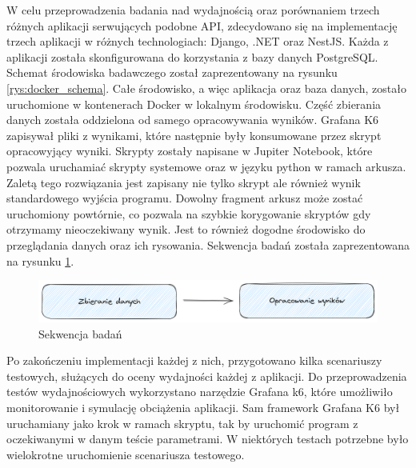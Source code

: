 W celu przeprowadzenia badania nad wydajnością oraz porównaniem trzech różnych aplikacji serwujących podobne API, zdecydowano się na implementację trzech aplikacji w różnych technologiach: Django, .NET oraz NestJS.
Każda z aplikacji została skonfigurowana do korzystania z bazy danych PostgreSQL.
Schemat środowiska badawczego został zaprezentowany na rysunku \ref{rys:docker_schema}.
Całe środowisko, a więc aplikacja oraz baza danych, zostało uruchomione w kontenerach Docker w lokalnym środowisku.
Część zbierania danych została oddzielona od samego opracowywania wyników.
Grafana K6 zapisywał pliki z wynikami, które następnie były konsumowane przez skrypt opracowyjący wyniki.
Skrypty zostały napisane w Jupiter Notebook, które pozwala uruchamiać skrypty systemowe oraz w języku python w ramach arkusza.
Zaletą tego rozwiązania jest zapisany nie tylko skrypt ale również wynik standardowego wyjścia programu.
Dowolny fragment arkusz może zostać uruchomiony powtórnie, co pozwala na szybkie korygowanie skryptów gdy otrzymamy nieoczekiwany wynik.
Jest to również dogodne środowisko do przeglądania danych oraz ich rysowania.
Sekwencja badań została zaprezentowana na rysunku \ref{rys:test_flow}.

\begin{figure}[!hb]
	\centering \includegraphics[width=1\linewidth]{rysunki/test_flow.png}
	\caption{Sekwencja badań}
	\label{rys:test_flow}
\end{figure}

Po zakończeniu implementacji każdej z nich, przygotowano kilka scenariuszy testowych, służących do oceny wydajności każdej z aplikacji.
Do przeprowadzenia testów wydajnościowych wykorzystano narzędzie Grafana k6, które umożliwiło monitorowanie i symulację obciążenia aplikacji.
Sam framework Grafana K6 był uruchamiany jako krok w ramach skryptu, tak by uruchomić program z oczekiwanymi w danym teście parametrami.
W niektórych testach potrzebne było wielokrotne uruchomienie scenariusza testowego.


